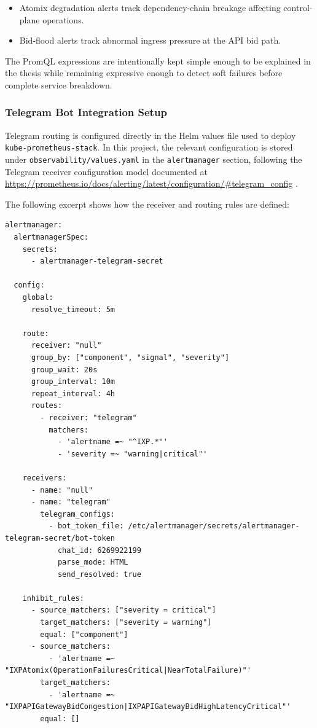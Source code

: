 \begin{itemize}
    \item Atomix degradation alerts track dependency-chain breakage affecting control-plane operations.
    \item Bid-flood alerts track abnormal ingress pressure at the API bid path.
\end{itemize}

The PromQL expressions are intentionally kept simple enough to be explained in the thesis while remaining expressive enough to detect soft failures before complete service breakdown.

\subsubsection{Telegram Bot Integration Setup}

Telegram routing is configured directly in the Helm values file used to deploy \texttt{kube-prometheus-stack}. In this project, the relevant configuration is stored under \texttt{observability/values.yaml} in the \texttt{alertmanager} section, following the Telegram receiver configuration model documented at \url{https://prometheus.io/docs/alerting/latest/configuration/#telegram_config} \cite{prometheusAlertmanagerDocumentation}.

The following excerpt shows how the receiver and routing rules are defined:

\begin{verbatim}
alertmanager:
  alertmanagerSpec:
    secrets:
      - alertmanager-telegram-secret

  config:
    global:
      resolve_timeout: 5m

    route:
      receiver: "null"
      group_by: ["component", "signal", "severity"]
      group_wait: 20s
      group_interval: 10m
      repeat_interval: 4h
      routes:
        - receiver: "telegram"
          matchers:
            - 'alertname =~ "^IXP.*"'
            - 'severity =~ "warning|critical"'

    receivers:
      - name: "null"
      - name: "telegram"
        telegram_configs:
          - bot_token_file: /etc/alertmanager/secrets/alertmanager-telegram-secret/bot-token
            chat_id: 6269922199
            parse_mode: HTML
            send_resolved: true

    inhibit_rules:
      - source_matchers: ["severity = critical"]
        target_matchers: ["severity = warning"]
        equal: ["component"]
      - source_matchers:
          - 'alertname =~ "IXPAtomix(OperationFailuresCritical|NearTotalFailure)"'
        target_matchers:
          - 'alertname =~ "IXPAPIGatewayBidCongestion|IXPAPIGatewayBidHighLatencyCritical"'
        equal: []
\end{verbatim}

